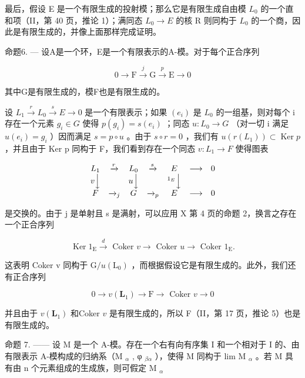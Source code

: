 最后，假设 E 是一个有限生成的投射模；那么它是有限生成自由模 \(L_{0}\) 的一个直和项（II，第 40 页，推论 1）；满同态 \(L_{0} \rightarrow E\) 的核 R 则同构于 \(L_{0}\) 的一个商，因此是有限生成的，并像上面那样完成证明。

命题6. --- 设A是一个环，E是一个有限表示的A-模。对于每个正合序列

\[
0 \longrightarrow \mathrm{F} \stackrel {j} {\longrightarrow} \mathrm{G} \stackrel {p} {\longrightarrow} \mathrm{E} \longrightarrow 0
\]

其中G是有限生成的，模F也是有限生成的。

设 \(L_{1} \xrightarrow{r} L_{0} \xrightarrow{s} E \longrightarrow 0\) 是一个有限表示；如果 \((e_{i})\) 是 \(L_{0}\) 的一组基，则对每个 i 存在一个元素 \(g_{i} \in G\) 使得 \(p(g_{i}) = s(e_{i})\) ；同态 \(u : L_{0} \to G\) （对一切 i 满足 \(u(e_{i}) = g_{i}\) ）因而满足 \(s = p \circ u\) 。由于 \(s \circ r = 0\) ，我们有 \(u(r(L_{1})) \subset \operatorname{Ker} p\) ，并且由于 Ker p 同构于 F，我们看到存在一个同态 \(v : L_{1} \to F\) 使得图表

\[
\begin{array}{c c c c c c c} L _ {1} & \xrightarrow {r} & L _ {0} & \xrightarrow {s} & E & \longrightarrow & 0 \\ v \Big \downarrow & & u \Big \downarrow & & ^ {1 _ {E}} \Big \downarrow \\ F & \xrightarrow {} _ {j} & G & \xrightarrow {} _ {p} & E & \longrightarrow & 0 \end{array}
\]

是交换的。由于 j 是单射且 s 是满射，可以应用 X 第 4 页的命题 2，换言之存在一个正合序列

\[
\operatorname{Ker} 1 _ {\mathrm{E}} \xrightarrow {d} \text { Coker } v \longrightarrow \text { Coker } u \longrightarrow \text { Coker } 1 _ {\mathrm{E}}.
\]

这表明 Coker v 同构于 \(\mathrm{G}/u(\mathrm{L}_{0})\) ，而根据假设它是有限生成的。此外，我们还有正合序列

\[
0 \rightarrow v (\mathbf {L} _ {1}) \rightarrow \mathrm{F} \rightarrow \text { Coker } v \rightarrow 0
\]

并且由于 \(v(\mathbf{L}_1)\) 和Coker \(v\) 是有限生成的，所以 F（II，第 17 页，推论 5）也是有限生成的。

命题 7. —— 设 M 是一个 A-模。存在一个右有向有序集 I 和一个相对于 I 的、由有限表示 A-模构成的归纳系（M \(_{\alpha}\) , φ \(_{\beta\alpha}\) ），使得 M 同构于 lim M \(_{\alpha}\) 。若 M 具有由 n 个元素组成的生成族，则可假定 M \(_{\alpha}\)

